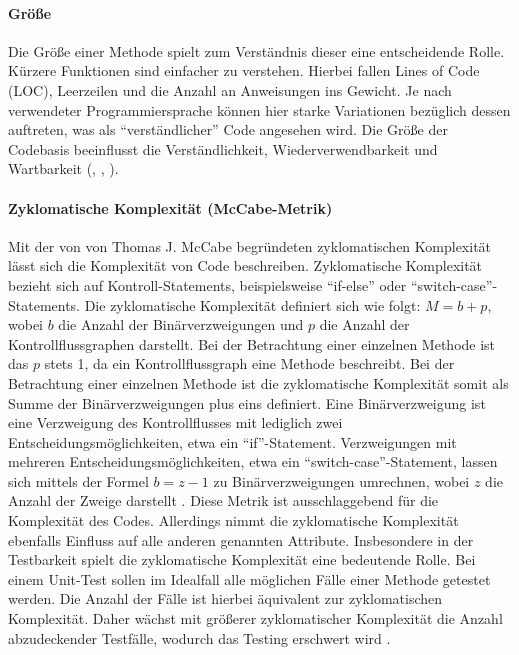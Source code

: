 \documentclass[a4paper, 12pt]{article}
\begin{document}
\paragraph{Größe}
Die Größe einer Methode spielt zum Verständnis dieser eine entscheidende Rolle. Kürzere Funktionen sind einfacher zu verstehen. 
Hierbei fallen Lines of Code (LOC), Leerzeilen und die Anzahl an Anweisungen ins Gewicht. 
Je nach verwendeter Programmiersprache können hier starke Variationen bezüglich dessen auftreten, was als \enquote{verständlicher} Code angesehen wird. Die Größe der Codebasis beeinflusst die Verständlichkeit, Wiederverwendbarkeit und Wartbarkeit (\textcite{Kim_software_implementation}, \textcite{Lorenz_object_oriented_software_metrics}, \textcite{Linda_softwarequality}).

\paragraph{Zyklomatische Komplexität (McCabe-Metrik)}
Mit der von von Thomas J. McCabe begründeten zyklomatischen Komplexität lässt sich die Komplexität von Code beschreiben. 
Zyklomatische Komplexität bezieht sich auf Kontroll-Statements, beispielsweise \enquote{if-else} oder \enquote{switch-case}-Statements.
Die zyklomatische Komplexität definiert sich wie folgt: $M = b + p$, wobei $b$ die Anzahl der Binärverzweigungen und $p$ die Anzahl der Kontrollflussgraphen darstellt.
Bei der Betrachtung einer einzelnen Methode ist das $p$ stets 1, da ein Kontrollflussgraph eine Methode beschreibt.
Bei der Betrachtung einer einzelnen Methode ist die zyklomatische Komplexität somit als Summe der Binärverzweigungen plus eins definiert.
Eine Binärverzweigung ist eine Verzweigung des Kontrollflusses mit lediglich zwei Entscheidungsmöglichkeiten, etwa ein \enquote{if}-Statement.
Verzweigungen mit mehreren Entscheidungsmöglichkeiten, etwa ein \enquote{switch-case}-Statement, lassen sich mittels der Formel $b = z - 1$ zu Binärverzweigungen umrechnen,  wobei $z$ die Anzahl der Zweige darstellt \parencite{McCabe_complexity}.
Diese Metrik ist ausschlaggebend für die Komplexität des Codes.
Allerdings nimmt die zyklomatische Komplexität ebenfalls Einfluss auf alle anderen genannten Attribute.
Insbesondere in der Testbarkeit spielt die zyklomatische Komplexität eine bedeutende Rolle.
Bei einem Unit-Test sollen im Idealfall alle möglichen Fälle einer Methode getestet werden.
Die Anzahl der Fälle ist hierbei äquivalent zur zyklomatischen Komplexität.
Daher wächst mit größerer zyklomatischer Komplexität die Anzahl abzudeckender Testfälle, wodurch das Testing erschwert wird \parencite{Linda_softwarequality}.
\end{document}

